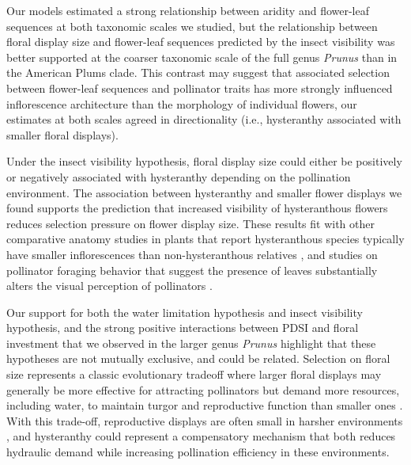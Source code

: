 \documentclass{article}[12pt]
\begin{document}
{Our models estimated a strong relationship between aridity and flower-leaf sequences at both taxonomic scales we studied, but the relationship between floral display size and flower-leaf sequences predicted by the insect visibility was better supported at the coarser taxonomic scale of the full genus \emph{Prunus} than in the American Plums clade. This contrast may suggest that associated selection between flower-leaf sequences and pollinator traits has more strongly influenced inflorescence architecture than the morphology of individual flowers, our estimates at both scales agreed in directionality (i.e., hysteranthy associated with smaller floral displays). 

Under the insect visibility hypothesis, floral display size could either be positively or negatively associated with hysteranthy depending on the pollination environment. The association between hysteranthy and smaller flower displays we found supports the prediction that increased visibility of hysteranthous flowers reduces selection pressure on flower display size. These results fit with other comparative anatomy studies in plants that report hysteranthous species typically have smaller inflorescences than non-hysteranthous relatives \citep{Gunatilleke1984}, and studies on pollinator foraging behavior that suggest the presence of leaves substantially alters the visual perception of pollinators \citep{Rivest:2017aa,Forrest:2009aa}.%

Our support for both the water limitation hypothesis and insect visibility hypothesis, and the strong positive interactions between PDSI and floral investment that we observed in the larger genus \emph{Prunus} highlight that these hypotheses are not mutually exclusive, and could be related. Selection on floral size represents a classic evolutionary tradeoff where larger floral displays may generally be more effective for attracting pollinators but demand more resources, including water, to maintain turgor and reproductive function than smaller ones \citep{Galen:1999vr,Lambrecht:2007ur}. With this trade-off, reproductive displays are often small in harsher environments \citep{Lambrecht:2013aa,Teixido:2016aa}, and hysteranthy could represent a compensatory mechanism that both reduces hydraulic demand while increasing pollination efficiency in these environments. %
 
}
\end{document}
